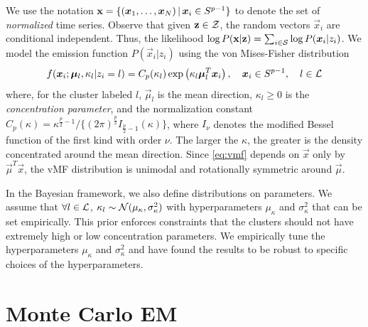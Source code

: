 \documentclass[runningheads, a4paper]{llncs}
\begin{document}

We use the notation $\mat x = \{ (\vec x_1, \dots, \vec x_N)\, |\,
\vec x_i \in S^{p-1} \}$ to denote the set of \emph{normalized} time
series. Observe that given $\text{\bf z} \in \mathcal{Z}$, the random vectors $\vec
x_i$ are conditional independent. Thus, the likelihood $\log
P(\mat x | \mat z) = \sum_{i \in \cS} \log P (\vec x_i | z_i)$. We
model the emission function $P(\vec x_i | z_i)$ using the von
Mises-Fisher distribution
\begin{equation}
  f (\vec x_i;\vec \mu_l, \kappa_l | z_i = l)
  =
  C_p(\kappa_l)
  \exp
  \left(\kappa_l \vec \mu_l^T \vec x_i\right),
  \quad
  \vec x_i \in S^{p-1},
  \quad
  l \in {\cL}
  \label{eq:vmf}
\end{equation}
where, for the cluster labeled $l$, $\vec \mu_l$ is the mean
direction, $\kappa_l \geq 0$ is the \emph{concentration parameter},
and the normalization constant $C_p(\kappa) = {\kappa^{\frac{p}{2} -
    1}}/\{{(2\pi)^{\frac{p}{2}} I_{\frac{p}{2}-1}(\kappa)}\}$, where
$I_\nu$ denotes the modified Bessel function of the first kind with
order $\nu$. The larger the $\kappa$, the greater is the density
concentrated around the mean direction. Since \eqref{eq:vmf} depends
on $\vec x$ only by $\vec \mu^T \vec x$, the vMF distribution is
unimodal and rotationally symmetric around $\vec \mu$.


In the Bayesian framework, we also define distributions on parameters. We assume
that $\forall l \in \mathcal{L}$, $\kappa_l \sim \mathcal{N}(\mu_{\kappa}, \sigma_{\kappa}^2)$
with hyperparameters $\mu_{\kappa}$ and $\sigma_{\kappa}^2$ that can be set
empirically. This prior enforces constraints that the clusters should not have
extremely high or low concentration parameters. We empirically tune the
hyperparameters $\mu_{\kappa}$ and $\sigma_{\kappa}^2$ and have found the results to be
robust to specific choices of the hyperparameters. 


\section{Monte Carlo EM}
\label{sec:mcem}
\end{document}
